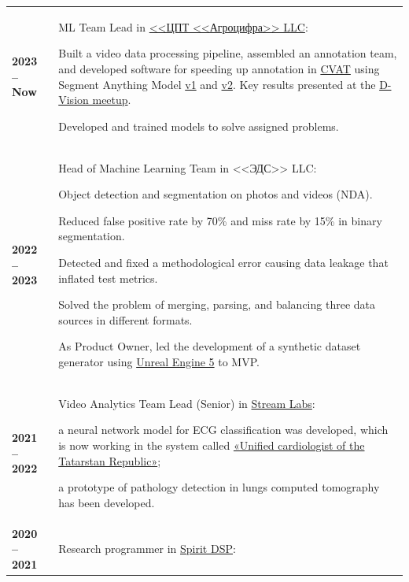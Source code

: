 \documentclass[11pt]{article}
\begin{document}
	\begin{tabular} {l | p{}}
		\textbf{2023 -- Now} & ML Team Lead in \href{https://agrodigit.ru/}{<<ЦПТ <<Агроцифра>> LLC}:
		\begin{tabitemize}
			\item Built a video data processing pipeline, assembled an annotation team, and developed software for speeding up annotation in \href{https://www.cvat.ai/}{CVAT} using Segment Anything Model \href{https://segment-anything.com/}{v1} and \href{https://sam2.metademolab.com/demo}{v2}. Key results presented at the \href{https://rutube.ru/video/4033ea0473199564892cc5a2f14dcfe6/}{D-Vision meetup}.
			\item Developed and trained models to solve assigned problems.
		\end{tabitemize}
\\[0.5em]
		\textbf{2022 -- 2023} & Head of Machine Learning Team in <<ЭДС>> LLC:
		\begin{tabitemize}
			\item Object detection and segmentation on photos and videos (NDA).
			\item Reduced false positive rate by 70\% and miss rate by 15\% in binary segmentation.
			\item Detected and fixed a methodological error causing data leakage that inflated test metrics.
			\item Solved the problem of merging, parsing, and balancing three data sources in different formats.
			\item As Product Owner, led the development of a synthetic dataset generator using \href{https://www.unrealengine.com/en-US/unreal-engine-5}{Unreal Engine 5} to MVP.
		\end{tabitemize}
\\[0.5em]
		\textbf{2021 -- 2022} & Video Analytics Team Lead (Senior) in \href{https://www.stream-labs.com/}{Stream Labs}:
		\begin{tabitemize}
			\item a neural network model for ECG classification was developed, which is now working in the system called \href{https://va1235.wixsite.com/tis-tat/edinyj-kardiolog-respubliki-tatarst}{«Unified cardiologist of the Tatarstan Republic»};
			\item a prototype of pathology detection in lungs computed tomography has been developed.
		\end{tabitemize}
\\[0.5em]
		\textbf{2020 -- 2021} & Research programmer in \href{https://www.spiritdsp.com/company/}{Spirit DSP}:

\end{tabular}
\end{document}
